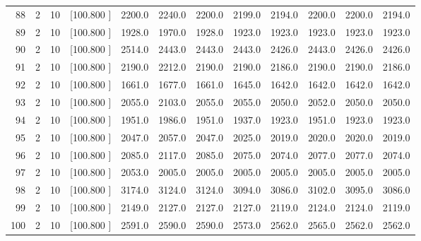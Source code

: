 \documentclass[12pt,a4paper]{article}
\begin{document}
\begin{center}
{\begin{tabular}{r r r r r r r r r r r r}
  88&  2& 10&[100.800   ]&  2200.0&  2240.0&  2200.0&  2199.0&  2194.0&  2200.0&  2200.0&  2194.0\\[-0.02in]
  89&  2& 10&[100.800   ]&  1928.0&  1970.0&  1928.0&  1923.0&  1923.0&  1923.0&  1923.0&  1923.0\\[-0.02in]
  90&  2& 10&[100.800   ]&  2514.0&  2443.0&  2443.0&  2443.0&  2426.0&  2443.0&  2426.0&  2426.0\\[-0.02in]
  91&  2& 10&[100.800   ]&  2190.0&  2212.0&  2190.0&  2190.0&  2186.0&  2190.0&  2190.0&  2186.0\\[-0.02in]
  92&  2& 10&[100.800   ]&  1661.0&  1677.0&  1661.0&  1645.0&  1642.0&  1642.0&  1642.0&  1642.0\\[-0.02in]
  93&  2& 10&[100.800   ]&  2055.0&  2103.0&  2055.0&  2055.0&  2050.0&  2052.0&  2050.0&  2050.0\\[-0.02in]
  94&  2& 10&[100.800   ]&  1951.0&  1986.0&  1951.0&  1937.0&  1923.0&  1951.0&  1923.0&  1923.0\\[-0.02in]
  95&  2& 10&[100.800   ]&  2047.0&  2057.0&  2047.0&  2025.0&  2019.0&  2020.0&  2020.0&  2019.0\\[-0.02in]
  96&  2& 10&[100.800   ]&  2085.0&  2117.0&  2085.0&  2075.0&  2074.0&  2077.0&  2077.0&  2074.0\\[-0.02in]
  97&  2& 10&[100.800   ]&  2053.0&  2005.0&  2005.0&  2005.0&  2005.0&  2005.0&  2005.0&  2005.0\\[-0.02in]
  98&  2& 10&[100.800   ]&  3174.0&  3124.0&  3124.0&  3094.0&  3086.0&  3102.0&  3095.0&  3086.0\\[-0.02in]
  99&  2& 10&[100.800   ]&  2149.0&  2127.0&  2127.0&  2127.0&  2119.0&  2124.0&  2124.0&  2119.0\\[-0.02in]
 100&  2& 10&[100.800   ]&  2591.0&  2590.0&  2590.0&  2573.0&  2562.0&  2565.0&  2562.0&  2562.0\\[-0.02in]

\hline
\end{tabular}}
\end{center}
\end{document}
